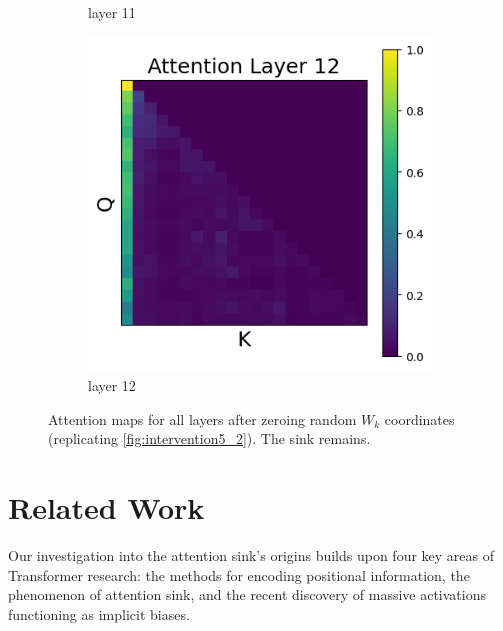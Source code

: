 \documentclass[11pt]{article}
\newif\ifYRMcomments
\newcommand{\YRM}[1]{\ifYRMcomments\textcolor{red}{[YRM: #1]}\fi}
\begin{document}
\begin{figure}[t]
\begin{subfigure}[t]{0.24\textwidth}
    \caption{layer 11}
  \end{subfigure}\hfill
  \begin{subfigure}[t]{0.24\textwidth}
    \centering
    \includegraphics[width=1.4\columnwidth]{figures/intervention5_2/layer_12.png}
    \caption{layer 12}
  \end{subfigure}\hfill

  \caption{Attention maps for all layers after zeroing random $W_k$ coordinates (replicating \cref{fig:intervention5_2}). The sink remains.}
\end{figure}



\section{Related Work}
\YRM{I didn't look at this part yet, waiting for you to finish it fist :) } 

\YRM{As mentioned, this needs to be improved - By citing more, making this more concise (as concise as possible while including really vital info, and adding more in appendix if needed, like we did in our attention knockout paper )}Our investigation into the attention sink's origins builds upon four key areas of Transformer research: the methods for encoding positional information, the phenomenon of attention sink, and the recent discovery of massive activations functioning as implicit biases.
\end{document}
